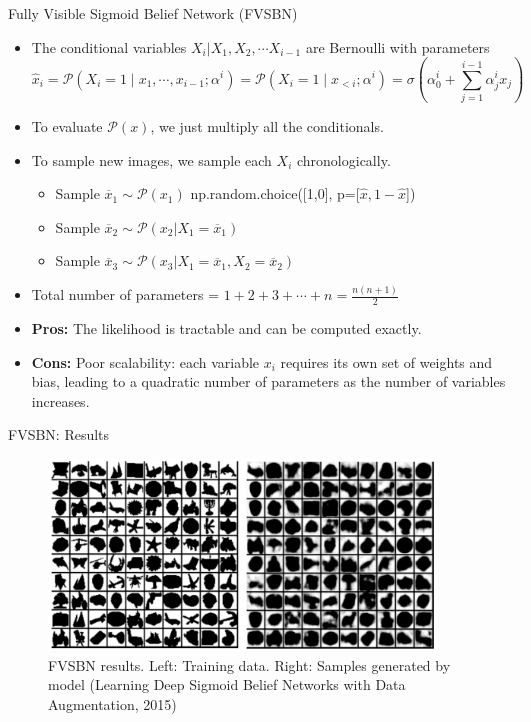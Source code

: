 \begin{frame}[allowframebreaks]{Fully Visible Sigmoid Belief Network (FVSBN)}
\framebreak

\begin{itemize}
    \setlength{\itemsep}{-0.25em}
    \item The conditional variables $X_i | X_1, X_2, \cdots X_{i-1}$ are Bernoulli with parameters
    \vspace{-1em}
    \begin{equation*}
        \hat{x}_i = \mathcal{P}(X_i=1 \mid x_1, \cdots, x_{i-1}; \alpha^i) = \mathcal{P}(X_i=1 \mid x_{<i}; \alpha^i) = \sigma (\alpha_0^i + \sum^{i-1}_{j=1}\alpha_j^i x_j)
    \end{equation*}
    \vspace{-1.5em}
    \item To evaluate $\mathcal{P}(x)$, we just multiply all the conditionals.
    \item To sample new images, we sample each $X_i$ chronologically.
    \begin{itemize}
        \item Sample $\overline{x}_1 \sim \mathcal{P}(x_1)$ np.random.choice([1,0], p=[$\hat{x}, 1-\hat{x}$])
        \item Sample $\overline{x}_2 \sim \mathcal{P}(x_2 | X_1=\overline{x}_1)$
        \item Sample $\overline{x}_3 \sim \mathcal{P}(x_3 | X_1=\overline{x}_1, X_2=\overline{x}_2)$
    \end{itemize}
    \item Total number of parameters = $1+2+3+ \cdots +n = \frac{n(n+1)}{2}$
    \item \textbf{Pros:} The likelihood is tractable and can be computed exactly.
    \item \textbf{Cons:} Poor scalability: each variable $x_i$ requires its own set of weights and bias, leading to a quadratic number of parameters as the number of variables increases.
\end{itemize}
\end{frame}


\begin{frame}{FVSBN: Results}

\begin{figure}
    \centering
    \includegraphics[height=2.0in]{images/arm/fvsbn_results.png}
    \caption{FVSBN results. Left: Training data. Right: Samples generated by model (Learning Deep Sigmoid Belief Networks with Data Augmentation, 2015)}
\end{figure}
    
\end{frame}